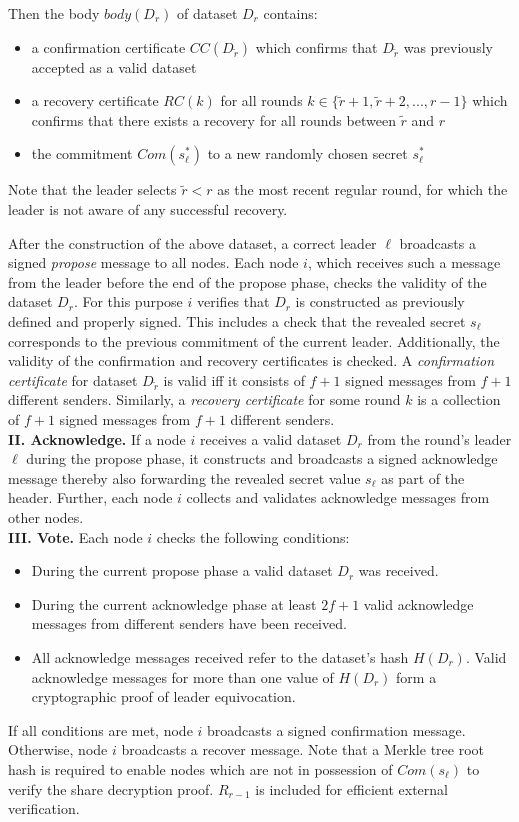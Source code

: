 \documentclass[11pt]{article}
\theoremstyle{definition}
\theoremstyle{remark}
\begin{document}
Then the body $body(D_r)$ of dataset $D_r$ contains:
\begin{itemize}
\item a confirmation certificate $CC(D_{\tilde{r}})$ which confirms that $D_{\tilde{r}}$ was previously accepted as a valid dataset
\item a recovery certificate $RC(k)$ for all rounds $k \in \{\tilde{r} + 1, \tilde{r} + 2, ..., r - 1\}$ which confirms that there exists a recovery for all rounds between $\tilde{r}$ and $r$
\item the commitment $Com(s^*_\ell)$ to a new randomly chosen secret $s^*_\ell$
\end{itemize}
Note that the leader selects $\tilde{r} < r$ as the most recent regular round, for which the leader is not aware of any successful recovery.

After the construction of the above dataset, a correct leader $\ell$ broadcasts a signed \textit{propose} message to all nodes. Each node $i$, which receives such a message from the leader before the end of the propose phase, checks the validity of the dataset $D_r$. For this purpose $i$ verifies that $D_r$ is constructed as previously defined and properly signed. This includes a check that the revealed secret $s_\ell$ corresponds to the previous commitment of the current leader. Additionally, the validity of the confirmation and recovery certificates is checked. A \textit{confirmation certificate} for dataset $D_{\tilde{r}}$ is valid iff it consists of $f + 1$ signed messages from $f + 1$ different senders. Similarly, a \textit{recovery certificate} for some round $k$ is a collection of $f + 1$ signed messages from $f + 1$ different senders.\\

\textbf{II. Acknowledge.} If a node $i$ receives a valid dataset $D_r$ from the round's leader $\ell$ during the propose phase, it constructs and broadcasts a signed acknowledge message thereby also forwarding the revealed secret value $s_\ell$ as part of the header. Further, each node $i$ collects and validates acknowledge messages from other nodes.\\

\textbf{III. Vote.} Each node $i$ checks the following conditions:
\begin{itemize}
\item During the current propose phase a valid dataset $D_r$ was received.
\item During the current acknowledge phase at least $2 f + 1$ valid acknowledge messages from different senders have been received.
\item All acknowledge messages received refer to the dataset's hash $H(D_r)$. Valid acknowledge messages for more than one value of $H(D_r)$ form a cryptographic proof of leader equivocation.
\end{itemize}
If all conditions are met, node $i$ broadcasts a signed confirmation message. Otherwise, node $i$ broadcasts a recover message. Note that a Merkle tree root hash is required to enable nodes which are not in possession of $Com(s_\ell)$ to verify the share decryption proof. $R_{r - 1}$ is included for efficient external verification.
\end{document}

